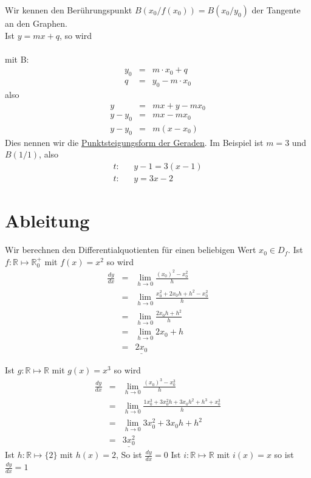 \documentclass{report}
\begin{document}
Wir kennen den Berührungspunkt $B(x_0 / f(x_0)) = B (x_0 / y_0)$ der Tangente an den Graphen.\\
Ist $y = mx + q$, so wird\\\\
mit B: \begin{eqnarray}y_0 & = & m \cdot x_0 + q \nonumber \\
q & = & y_0 - m \cdot x_0\end{eqnarray}
also
\begin{eqnarray}y & = & mx + y - mx_0 \nonumber \\
y - y_0 & = & mx - mx_0 \nonumber \\
y - y_0 & = & m(x - x_0) \end{eqnarray}
Dies nennen wir die \underline{Punktsteigungsform der Geraden}. Im Beispiel ist $m = 3$ und $B(1/1)$, also
\begin{eqnarray}t:& & y - 1 = 3(x-1) \nonumber \\
t: & & y = 3x -2\end{eqnarray}

\section{Ableitung}
Wir berechnen den Differentialquotienten für einen beliebigen Wert $x_0 \in D_f$. 
Ist $f:\mathbb{R} \mapsto \mathbb{R}_0^+$ mit $f(x) = x^2$ so wird \begin{eqnarray}
 \frac{dy}{dx} & = & \lim_{h \to 0} \frac{(x_0)^2 - x_0^2}{h} \nonumber \\
 & = & \lim_{h \to 0} \frac{x_0^2 + 2x_0h + h^2 -x_0^2}{h}  \nonumber \\
 & = & \lim_{h \to 0} \frac{2x_0h + h^2}{h}  \nonumber \\
 & = & \lim_{h \to 0} 2x_0 + h \nonumber \\
 & = & \underline{2x_0} \end{eqnarray}

Ist $ g:\mathbb{R} \mapsto \mathbb{R}$ mit $ g(x) = x^3$ so wird \begin{eqnarray}
\frac{dy}{dx} & = & \lim_{h \to 0} \frac{(x_0)^3 - x_0^3}{h} \nonumber \\
& = & \lim_{h \to 0} \frac{1x_0^3 + 3x_0^2h + 3 x_0h^2 + h^3 + x_0^3}{h} \nonumber \\
& = & \lim_{h \to 0} 3x_0^2 + 3x_0h + h^2  \nonumber \\
& = & \underline{3x_0^2} \end{eqnarray}
Ist $ h:\mathbb{R} \mapsto \{2\}$ mit $ h(x) = 2$, %
So ist $ \frac{dy}{dx} = 0$
Ist $ i:\mathbb{R} \mapsto \mathbb{R}$ mit $ i(x) = x$ %
so ist $\frac{dy}{dx} = 1$
\end{document}
